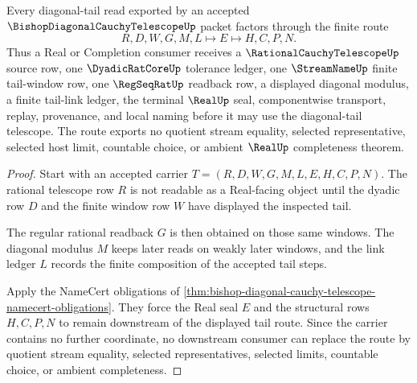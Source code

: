 \begin{theorem}
\label{thm:bishop-diagonal-cauchy-telescope-tail-route}
Every diagonal-tail read exported by an accepted $\BishopDiagonalCauchyTelescopeUp$ packet factors through the finite route
$$
R,D,W,G,M,L \longmapsto E \longmapsto H,C,P,N .
$$
Thus a Real or Completion consumer receives a $\RationalCauchyTelescopeUp$ source row, one $\DyadicRatCoreUp$ tolerance ledger, one $\StreamNameUp$ finite tail-window row, one $\RegSeqRatUp$ readback row, a displayed diagonal modulus, a finite tail-link ledger, the terminal $\RealUp$ seal, componentwise transport, replay, provenance, and local naming before it may use the diagonal-tail telescope. The route exports no quotient stream equality, selected representative, selected host limit, countable choice, or ambient $\RealUp$ completeness theorem.
\end{theorem}
\begin{proof}
Start with an accepted carrier $T=(R,D,W,G,M,L,E,H,C,P,N)$. The rational telescope row $R$ is not readable as a Real-facing object until the dyadic row $D$ and the finite window row $W$ have displayed the inspected tail.

The regular rational readback $G$ is then obtained on those same windows. The diagonal modulus $M$ keeps later reads on weakly later windows, and the link ledger $L$ records the finite composition of the accepted tail steps.

Apply the NameCert obligations of \autoref{thm:bishop-diagonal-cauchy-telescope-namecert-obligations}. They force the Real seal $E$ and the structural rows $H,C,P,N$ to remain downstream of the displayed tail route. Since the carrier contains no further coordinate, no downstream consumer can replace the route by quotient stream equality, selected representatives, selected limits, countable choice, or ambient completeness.
\end{proof}



